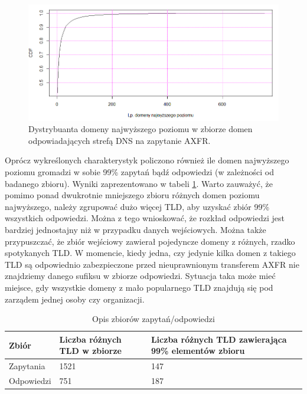 \begin{figure}[h]
	\centering
	\includegraphics[width=1.0\textwidth]{image/cdf_tld_resp_no_title}
	\caption{Dystrybuanta domeny najwyższego poziomu w zbiorze domen odpowiadających strefą DNS na zapytanie AXFR.}
	\label{cdf_tld_resp}
\end{figure}


Oprócz wykreślonych charakterystyk policzono również ile domen najwyższego poziomu gromadzi w sobie 99\% zapytań bądź odpowiedzi
(w zależności od badanego zbioru). Wyniki zaprezentowano w tabeli \ref{cdf_table}. Warto zauważyć, że pomimo ponad dwukrotnie
mniejszego zbioru różnych domen poziomu najwyższego, należy zgrupować dużo więcej TLD, aby uzyskać zbiór 99\% wszystkich odpowiedzi.
Można z tego wnioskować, że rozkład odpowiedzi jest bardziej jednostajny niż w przypadku danych wejściowych. Można także przypuszczać,
że zbiór wejściowy zawierał pojedyncze domeny z różnych, rzadko spotykanych TLD. W momencie, kiedy jedna, czy jedynie kilka domen
z takiego TLD są odpowiednio zabezpieczone przed nieuprawnionym transferem AXFR nie znajdziemy danego sufiksu w zbiorze odpowiedzi.
Sytuacja taka może mieć miejsce, gdy wszystkie domeny z mało popularnego TLD znajdują się pod zarządem jednej osoby czy organizacji.

\begin{table}[h]
	\centering
	\label{cdf_table}
	\begin{tabular}{|p{}|p{}|p{}|}
		\hline
		\textbf{Zbiór} &
		\textbf{Liczba różnych TLD w zbiorze} &
		\textbf{Liczba różnych TLD zawierająca 99\% elementów zbioru} \\
		\hline\hline
		Zapytania &
		1521 &
		147\\
		\hline
		Odpowiedzi &
		751 &
		187\\
		\hline
	\end{tabular}
	\caption{Opis zbiorów zapytań/odpowiedzi}
\end{table}

